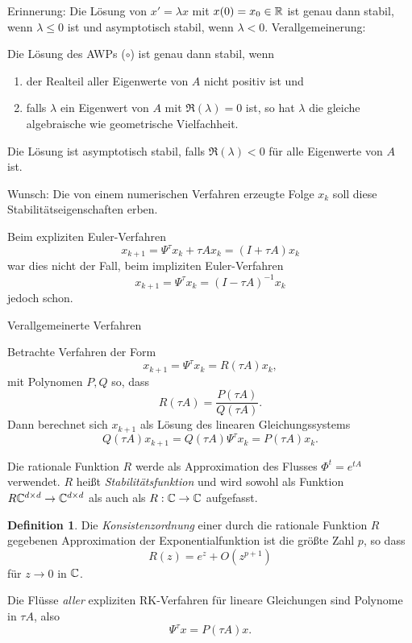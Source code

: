 \documentclass[
 a4paper,
 12pt,
 parskip=half
 ]{scrreprt}
\theoremstyle{plain}
\theoremstyle{definition}
\numberwithin{rmrk}{chapter}
\numberwithin{defn}{chapter}
\numberwithin{exmp}{chapter}
\numberwithin{prgp}{subsection}
\newtheorem*{defn*}{Definition}
\numberwithin{equation}{chapter}
\begin{document}
Erinnerung: Die Lösung von $x' = \lambda x$ mit $x(0) = x_0 \in \mathbb{R}$ ist genau dann
stabil, wenn $\lambda \le 0$ ist und asymptotisch stabil, wenn $\lambda < 0$.
Verallgemeinerung:
\begin{thm} %
  Die Lösung des AWPs ($\circ$) ist genau dann stabil, wenn
  \begin{enumerate}
  \item der Realteil aller Eigenwerte von $A$ nicht positiv ist und
  \item falls $\lambda$ ein Eigenwert von $A$ mit $\Re(\lambda) = 0$ ist, so hat
    $\lambda$ die gleiche algebraische wie geometrische Vielfachheit.
  \end{enumerate}
  Die Lösung ist asymptotisch stabil, falls $\Re(\lambda) < 0$ für alle
  Eigenwerte von $A$ ist.
\end{thm}

Wunsch: Die von einem numerischen Verfahren erzeugte Folge $x_k$ soll diese
Stabilitätseigenschaften erben.

Beim expliziten Euler-Verfahren
\[ x_{k+1} = \Psi^\tau x_k + \tau A x_k = (I + \tau A) x_k \]
war dies nicht der Fall, beim impliziten Euler-Verfahren
\[ x_{k+1} = \Psi^\tau x_k = (I - \tau A)^{-1} x_k \]
jedoch schon.

Verallgemeinerte Verfahren

Betrachte Verfahren der Form
\[ x_{k+1} = \Psi^\tau x_k = R(\tau A) x_k, \]
mit Polynomen $P, Q$ so, dass
\[ R(\tau A) = \frac{P(\tau A)}{Q(\tau A)}. \]
Dann berechnet sich $x_{k+1}$ als Lösung des linearen Gleichungssystems
\[ Q(\tau A) x_{k+1} = Q(\tau A) \Psi^\tau x_k = P(\tau A) x_k. \]

Die rationale Funktion $R$ werde als Approximation des Flusses $\Phi^t = e^{tA}$
verwendet. $R$ heißt \emph{Stabilitätsfunktion} und wird sowohl als Funktion $R
\mathbb{C}^{d \times d} \to \mathbb{C}^{d \times d}$ als auch als $R: \mathbb{C} \to \mathbb{C}$
aufgefasst.

\begin{defn*}
  Die \emph{Konsistenzordnung} einer durch die rationale Funktion $R$ gegebenen
  Approximation der Exponentialfunktion ist die größte Zahl $p$, so dass
  \[ R(z) = e^z + O(z^{p+1}) \]
  für $z \to 0$ in $\mathbb{C}$.
\end{defn*}

\begin{lem} %
  Die Flüsse \emph{aller} expliziten RK-Verfahren für lineare Gleichungen sind
  Polynome in $\tau A$, also
  \[ \Psi^\tau x = P(\tau A) x. \]
\end{lem}
\end{document}
